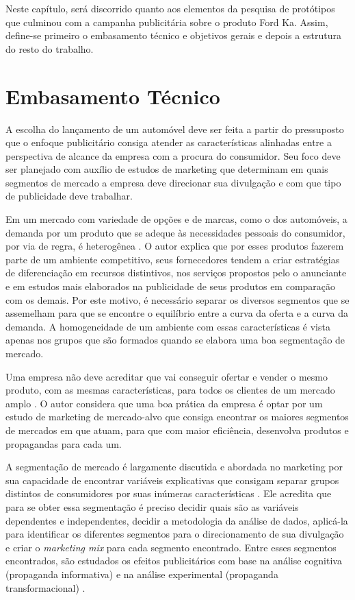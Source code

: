 Neste capítulo, será discorrido quanto aos elementos da pesquisa de
protótipos que culminou com a campanha publicitária sobre o produto
Ford Ka\texttrademark. Assim, define-se primeiro o embasamento técnico
e objetivos gerais e depois a estrutura do resto do trabalho.


\section{Embasamento Técnico}

\label{sec:embasamento-tecnico}

A escolha do lançamento de um automóvel deve ser feita a partir do
pressuposto que o enfoque publicitário consiga atender as características
alinhadas entre a perspectiva de alcance da empresa com a procura
do consumidor. Seu foco deve ser planejado com auxílio de estudos
de marketing que determinam em quais segmentos de mercado a empresa
deve direcionar sua divulgação e com que tipo de publicidade deve
trabalhar. 

Em um mercado com variedade de opções e de marcas, como o dos automóveis,
a demanda por um produto que se adeque às necessidades pessoais do
consumidor, por via de regra, é heterogênea \cite{smith1956}. O autor
explica que por esses produtos fazerem parte de um ambiente competitivo,
seus fornecedores tendem a criar estratégias de diferenciação em recursos
distintivos, nos serviços propostos pelo o anunciante e em estudos
mais elaborados na publicidade de seus produtos em comparação com
os demais. Por este motivo, é necessário separar os diversos segmentos
que se assemelham para que se encontre o equilíbrio entre a curva
da oferta e a curva da demanda. A homogeneidade de um ambiente com
essas características é vista apenas nos grupos que são formados quando
se elabora uma boa segmentação de mercado. 

Uma empresa não deve acreditar que vai conseguir ofertar e vender
o mesmo produto, com as mesmas características, para todos os clientes
de um mercado amplo \cite{kotler2000}. O autor considera que uma boa
prática da empresa é optar por um estudo de marketing de mercado-alvo
que consiga encontrar os maiores segmentos de mercados em que atuam,
para que com maior eficiência, desenvolva produtos e propagandas para
cada um. 

A segmentação de mercado é largamente discutida e abordada no marketing
por sua capacidade de encontrar variáveis explicativas que consigam
separar grupos distintos de consumidores por suas inúmeras características
\cite{myers1996}. Ele acredita que para se obter essa segmentação é
preciso decidir quais são as variáveis dependentes e independentes,
decidir a metodologia da análise de dados, aplicá-la para identificar
os diferentes segmentos para o direcionamento de sua divulgação e
criar o \emph{marketing mix} para cada segmento encontrado. Entre
esses segmentos encontrados, são estudados os efeitos publicitários
com base na análise cognitiva (propaganda informativa) e na análise
experimental (propaganda transformacional) \cite{puto1984}. 

